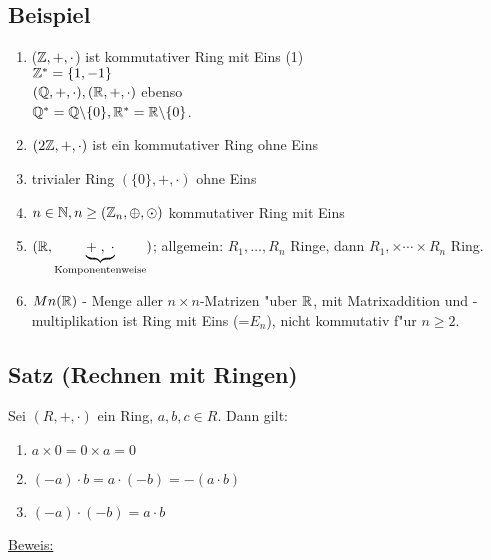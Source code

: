 \subsection{Beispiel}
\begin{enumerate}
	\item
	($\mathbb{Z}, +, \cdot$) ist kommutativer Ring mit Eins (1)\\
	$\mathbb{Z}^* = \{1,-1\}$\\
	$(\mathbb{Q}, +, \cdot), (\mathbb{R}, +, \cdot)$ ebenso\\
	$\mathbb{Q}^*=\mathbb{Q} \backslash \{0\}, \mathbb{R}^* = \mathbb{R} \backslash \{0\}$.
	\item
	$(2\mathbb{Z}, +, \cdot)$ ist ein kommutativer Ring ohne Eins
	\item
	trivialer Ring $(\{0\},+, \cdot)$ ohne Eins
	\item
	$n \in \mathbb{N}, n \geq (\mathbb{Z}_n, \oplus, \odot)$ kommutativer Ring mit Eins
	\item
	$(\mathbb{R}, \underbrace{+\; ,\; \cdot}_{\text{Komponentenweise}})$; allgemein: $R_1, \dots , R_n$ Ringe, dann $R_1, \times \cdots \times R_n$ Ring.
	\item
	$Mn (\mathbb{R})$ - Menge aller $n \times n$-Matrizen  "uber $\mathbb{R}$, mit Matrixaddition und -multiplikation ist Ring mit Eins (=$E_n$), nicht kommutativ f"ur $ n \geq 2$.
\end{enumerate}
\subsection{Satz (Rechnen mit Ringen)}
Sei $(R, +, \cdot)$ ein Ring, $a,b,c \in R$. Dann gilt:
\begin{enumerate}
	\item
	$a \times 0 = 0 \times a = 0$
	\item 
	$(-a)\cdot b = a \cdot (-b) = -(a \cdot b)$
	\item
	$(-a) \cdot (-b) = a \cdot b$
\end{enumerate}
\underline{Beweis:}
